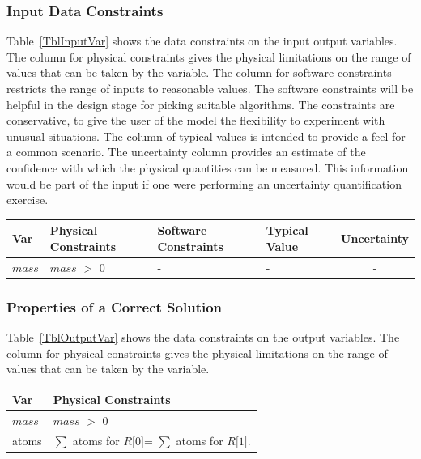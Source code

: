 \documentclass[12pt]{article}
\begin{document}
\subsubsection{Input Data Constraints} \label{sec_DataConstraints}    

Table~\ref{TblInputVar} shows the data constraints on the input output
variables.  The column for physical constraints gives the physical limitations
on the range of values that can be taken by the variable.  The column for
software constraints restricts the range of inputs to reasonable values.  The
software constraints will be helpful in the design stage for picking suitable
algorithms.  The constraints are conservative, to give the user of the model the
flexibility to experiment with unusual situations.  The column of typical values
is intended to provide a feel for a common scenario.  The uncertainty column
provides an estimate of the confidence with which the physical quantities can be
measured.  This information would be part of the input if one were performing an
uncertainty quantification exercise.


\begin{table}[!h]
  \caption{Input Variables} \label{TblInputVar}
  \renewcommand{\arraystretch}{1.2}
\noindent \begin{longtable*}{l l l l c} 
  \toprule
  \textbf{Var} & \textbf{Physical Constraints} & \textbf{Software Constraints} &
                             \textbf{Typical Value} & \textbf{Uncertainty}\\
  \midrule 
      $\textit{mass}$  &  $\textit{mass}$ $>$ 0  &  - & - & - \\
     
     \bottomrule
\end{longtable*}
\end{table}


\subsubsection{Properties of a Correct Solution} \label{sec_CorrectSolution}

\noindent
Table~\ref{TblOutputVar} shows the data constraints on the output variables. The column
for physical constraints gives the physical limitations on the range of values that can be
taken by the variable.

\begin{table}[!h]
\caption{Output Variables} \label{TblOutputVar}
\renewcommand{\arraystretch}{1.2}
\noindent \begin{longtable*}{l l} 
  \toprule
  \textbf{Var} & \textbf{Physical Constraints} \\
  \midrule 
  $\textit{mass}$ & $\textit{mass}$ $>$ 0 \\
  atoms &  $ \sum $ atoms for $\textit{R[0]}$=  $\sum$ atoms for $\textit{R[1]}$.   \\
   \bottomrule
\end{longtable*}
\end{table}
\end{document}
